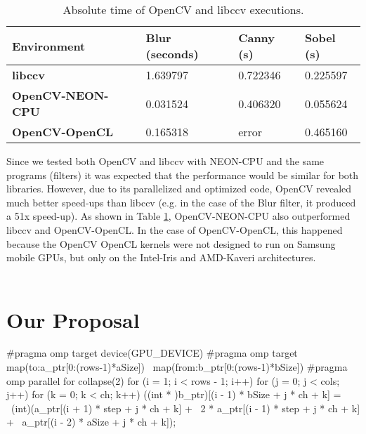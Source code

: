 \documentclass[12pt, fleqn]{article}
\begin{document}
\begin{table}[]
	\centering
	\caption{Absolute time of OpenCV and libccv executions.}
	\label{table:time}
	\begin{tabular}{|l||l||l||l|}
		\hline
		\textbf{Environment} & \textbf{Blur (seconds)} & \textbf{Canny (s)} & \textbf{Sobel (s)} \\ \hline
		\textbf{libccv}          & 1.639797                & 0.722346           & 0.225597           \\ \hline
		\textbf{OpenCV-NEON-CPU} & 0.031524                & 0.406320           & 0.055624           \\ \hline
		\textbf{OpenCV-OpenCL}   & 0.165318                & error              & 0.465160           \\ \hline
	\end{tabular}
\end{table}

Since we tested both OpenCV and libccv with NEON-CPU  and the same programs (filters) it was expected that the performance would be similar for both libraries. However, due to its parallelized and optimized code, OpenCV revealed much better  speed-ups than libccv  (e.g. in the case of the Blur filter, it produced a 51x speed-up). As shown in Table \ref{table:time},  OpenCV-NEON-CPU also outperformed  libccv and OpenCV-OpenCL. In the case of OpenCV-OpenCL, this happened because the OpenCV OpenCL kernels were not designed  to run on Samsung mobile GPUs, but only on the  Intel-Iris and AMD-Kaveri architectures.   \\ \\

\section{Our Proposal}
\label{sec:proposal}

\begin{python}[caption=A block of code from Sobel Filter, label=code:ex]
	#pragma omp target device(GPU_DEVICE)
	#pragma omp target map(to:a_ptr[0:(rows-1)*aSize]) \                             map(from:b_ptr[0:(rows-1)*bSize])
	#pragma omp parallel for collapse(2)
	for (i = 1; i < rows - 1; i++) {
		for (j = 0; j < cols; j++) {
			for (k = 0; k < ch; k++) {
				((int * )b_ptr)[(i - 1) * bSize +  j * ch + k] = \
				(int)(a_ptr[(i + 1) * step +  j * ch + k] + \ 
				2 * a_ptr[(i - 1) * step +  j * ch + k] + \
				a_ptr[(i - 2) * aSize + j * ch + k]);
			}
		}
	}
\end{python}
\end{document}
